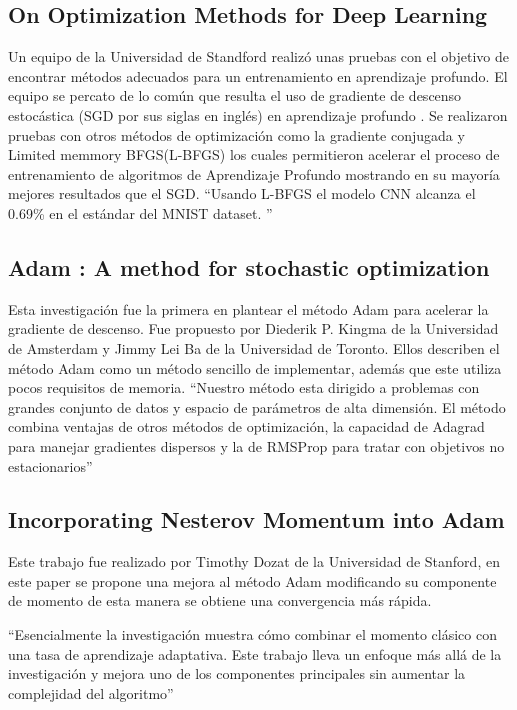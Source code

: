 \subsection{On Optimization Methods for Deep Learning}
Un equipo de la Universidad de Standford realizó unas pruebas con el objetivo de encontrar métodos adecuados para un entrenamiento en aprendizaje profundo. El equipo se percato de lo común que resulta el uso de gradiente de descenso estocástica (SGD por sus siglas en inglés) en aprendizaje profundo . Se realizaron pruebas con otros métodos de optimización como la gradiente conjugada y Limited memmory BFGS(L-BFGS) los cuales permitieron acelerar el proceso de entrenamiento de algoritmos de Aprendizaje Profundo mostrando en su mayoría mejores resultados que el SGD. \textquotedblleft Usando L-BFGS el modelo CNN alcanza el 0.69\%  en el estándar del MNIST dataset. \textquotedblright \cite{Optimization}

\subsection{Adam : A method for stochastic optimization}
Esta investigación fue la primera en plantear el método Adam para acelerar la gradiente de descenso. Fue propuesto por Diederik P. Kingma de la Universidad de Amsterdam y Jimmy Lei Ba de la Universidad de Toronto. Ellos describen el método Adam como un método sencillo de implementar, además que este utiliza pocos requisitos de memoria.
\textquotedblleft Nuestro método esta dirigido a problemas con grandes conjunto de datos y espacio de parámetros de alta dimensión. El método combina ventajas de otros métodos de optimización, la capacidad de Adagrad para manejar gradientes dispersos y la de RMSProp para tratar con objetivos no estacionarios\textquotedblright \cite{ADAM}
\vspace{2cm}
\subsection{Incorporating Nesterov Momentum into Adam}
Este trabajo fue realizado por Timothy Dozat de la Universidad de Stanford, en este paper se propone una mejora al método Adam modificando su componente de momento de esta manera se obtiene una convergencia más rápida.

\textquotedblleft Esencialmente la investigación muestra cómo combinar el momento clásico con una tasa de aprendizaje adaptativa. Este trabajo lleva un enfoque más allá de la investigación y mejora uno de los componentes principales sin aumentar la complejidad del algoritmo\textquotedblright \cite{NMIA}
\vspace{2cm}

